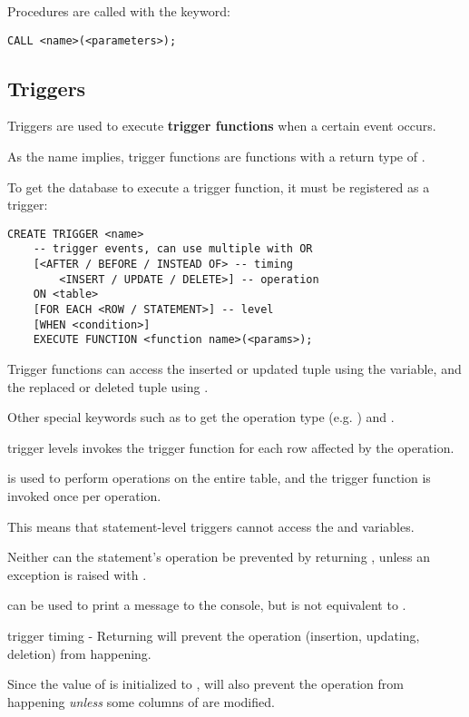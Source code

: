 Procedures are called with the  keyword:

\begin{lstlisting}
CALL <name>(<parameters>);
\end{lstlisting}

\subsection{Triggers}
Triggers are used to execute \textbf{trigger functions} when a certain event occurs.

As the name implies, trigger functions are functions with a return type of .

To get the database to execute a trigger function, it must be registered as a trigger:

\begin{lstlisting}
CREATE TRIGGER <name>
    -- trigger events, can use multiple with OR
    [<AFTER / BEFORE / INSTEAD OF> -- timing
        <INSERT / UPDATE / DELETE>] -- operation
    ON <table>
    [FOR EACH <ROW / STATEMENT>] -- level
    [WHEN <condition>]
    EXECUTE FUNCTION <function name>(<params>);
\end{lstlisting}

Trigger functions can access the inserted or updated tuple using the  variable, and the replaced or deleted tuple using .

Other special keywords such as  to get the operation type (e.g. ) and .

\begin{defn}{trigger levels}
     invokes the trigger function for each row affected by the operation.

     is used to perform operations on the entire table, and the trigger function is invoked once per operation.

    This means that statement-level triggers cannot access the  and  variables.

    Neither can the statement's operation be prevented by returning , unless an exception is raised with .
\end{defn}

 can be used to print a message to the console, but is not equivalent to .

\begin{defn}{trigger timing - }
    Returning  will prevent the operation (insertion, updating, deletion) from happening.

    Since the value of  is initialized to ,  will also prevent the operation from happening \textit{unless} some columns of  are modified.
\end{defn}

